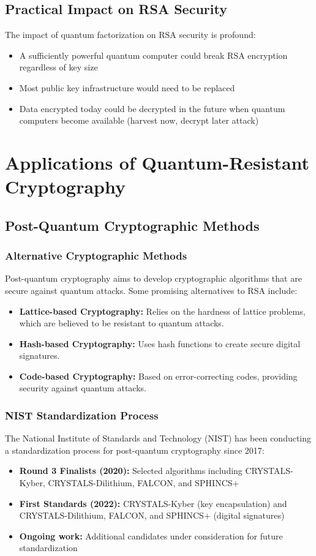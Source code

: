 \documentclass{article}
\begin{document}
\subsection{Practical Impact on RSA Security}
The impact of quantum factorization on RSA security is profound:
\begin{itemize}
    \item A sufficiently powerful quantum computer could break RSA encryption regardless of key size
    \item Most public key infrastructure would need to be replaced
    \item Data encrypted today could be decrypted in the future when quantum computers become available (harvest now, decrypt later attack)
\end{itemize}

\section{Applications of Quantum-Resistant Cryptography}
\subsection{Post-Quantum Cryptographic Methods}

\subsubsection{Alternative Cryptographic Methods}
Post-quantum cryptography aims to develop cryptographic algorithms that are secure against quantum attacks. Some promising alternatives to RSA include:
\begin{itemize}
    \item \textbf{Lattice-based Cryptography:} Relies on the hardness of lattice problems, which are believed to be resistant to quantum attacks.
    \item \textbf{Hash-based Cryptography:} Uses hash functions to create secure digital signatures.
    \item \textbf{Code-based Cryptography:} Based on error-correcting codes, providing security against quantum attacks.
\end{itemize}

\subsubsection{NIST Standardization Process}
The National Institute of Standards and Technology (NIST) has been conducting a standardization process for post-quantum cryptography since 2017:
\begin{itemize}
    \item \textbf{Round 3 Finalists (2020):} Selected algorithms including CRYSTALS-Kyber, CRYSTALS-Dilithium, FALCON, and SPHINCS+
    \item \textbf{First Standards (2022):} CRYSTALS-Kyber (key encapsulation) and CRYSTALS-Dilithium, FALCON, and SPHINCS+ (digital signatures)
    \item \textbf{Ongoing work:} Additional candidates under consideration for future standardization
\end{itemize}
\end{document}
